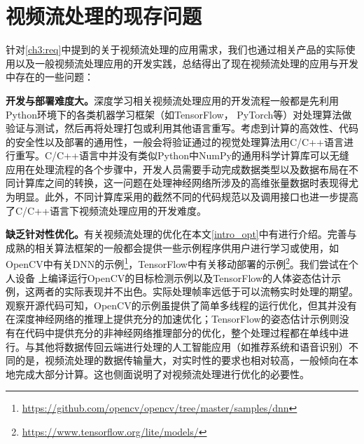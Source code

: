 \section{视频流处理的现存问题}\label{ch3:problems}
针对\ref{ch3:req}中提到的关于视频流处理的应用需求，我们也通过相关产品的实际使用以及一般视频流处理应用的开发实践，总结得出了现在视频流处理的应用与开发中存在的一些问题：\par
\textbf{开发与部署难度大。}深度学习相关视频流处理应用的开发流程一般都是先利用Python环境下的各类机器学习框架（如TensorFlow， PyTorch等）对处理算法做验证与测试，然后再将处理打包或利用其他语言重写。考虑到计算的高效性、代码的安全性以及部署的通用性，一般会将验证通过的视觉处理算法用C/C++语言进行重写。C/C++语言中并没有类似Python中NumPy\cite{oliphant2006guide}的通用科学计算库可以无缝应用在处理流程的各个步骤中，开发人员需要手动完成数据类型以及数据布局在不同计算库之间的转换，这一问题在处理神经网络所涉及的高维张量数据时表现得尤为明显。此外，不同计算库采用的截然不同的代码规范以及调用接口也进一步提高了C/C++语言下视频流处理应用的开发难度。\par
\textbf{缺乏针对性优化。}有关视频流处理的优化在本文\ref{intro_opt}中有进行介绍。完善与成熟的相关算法框架的一般都会提供一些示例程序供用户进行学习或使用，如OpenCV中有关DNN的示例\footnote{\url{https://github.com/opencv/opencv/tree/master/samples/dnn}}，TensorFlow中有关移动部署的示例\footnote{\url{https://www.tensorflow.org/lite/models/}}。我们尝试在个人设备%
上编译运行OpenCV的目标检测示例以及TensorFlow的人体姿态估计示例，这两者的实际表现并不出色。实际处理帧率远低于可以流畅实时处理的期望。
观察开源代码可知，OpenCV的示例虽提供了简单多线程的运行优化，但其并没有在深度神经网络的推理上提供充分的加速优化；TensorFlow的姿态估计示例则没有在代码中提供充分的非神经网络推理部分的优化，整个处理过程都在单线中进行。与其他将数据传回云端进行处理的人工智能应用（如推荐系统和语音识别）不同的是，视频流处理的数据传输量大，对实时性的要求也相对较高，一般倾向在本地完成大部分计算。这也侧面说明了对视频流处理进行优化的必要性。

